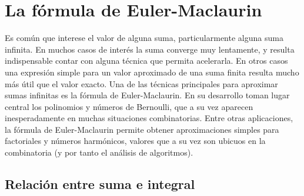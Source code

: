 %

\chapter{La fórmula de Euler-Maclaurin}
\label{cha:euler-maclaurin}

  Es común que interese el valor de alguna suma,
  particularmente alguna suma infinita.
  En muchos casos de interés la suma converge muy lentamente,
  y resulta indispensable
  contar con alguna técnica que permita acelerarla.
  En otros casos una expresión simple para un valor aproximado
  de una suma finita
  resulta mucho más útil que el valor exacto.
  Una de las técnicas principales para aproximar sumas infinitas
  es la fórmula de Euler-Maclaurin.
  En su desarrollo toman lugar central
  los polinomios y números de Bernoulli,
  que a su vez aparecen inesperadamente en muchas situaciones combinatorias.
  Entre otras aplicaciones,
  la fórmula de Euler-Maclaurin
  permite obtener aproximaciones simples para factoriales
  y números harmónicos,
  valores que a su vez son ubicuos en la combinatoria
  (y por tanto el análisis de algoritmos).

\section{Relación entre suma e integral}
\label{sec:relacion-suma-integral}


